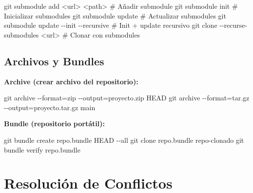 \documentclass[
  doc,
  floatsintext,
  longtable,
  a4paper,
  nolmodern,
  notxfonts,
  notimes,
  12pt,
  colorlinks=true,linkcolor=blue,citecolor=blue,urlcolor=blue]{apa7}
\newenvironment{Shaded}{\begin{snugshade}}{\end{snugshade}}
\newcommand{\AttributeTok}[1]{\textcolor[rgb]{0.40,0.45,0.13}{#1}}
\newcommand{\CommentTok}[1]{\textcolor[rgb]{0.37,0.37,0.37}{#1}}
\newcommand{\FunctionTok}[1]{\textcolor[rgb]{0.28,0.35,0.67}{#1}}
\newcommand{\NormalTok}[1]{\textcolor[rgb]{0.00,0.23,0.31}{#1}}
\newcommand{\OperatorTok}[1]{\textcolor[rgb]{0.37,0.37,0.37}{#1}}
\begin{document}
\begin{Shaded}
\begin{Highlighting}[]
\FunctionTok{git}\NormalTok{ submodule add }\OperatorTok{\textless{}}\NormalTok{url}\OperatorTok{\textgreater{}} \OperatorTok{\textless{}}\NormalTok{path}\OperatorTok{\textgreater{}}           \CommentTok{\# Añadir submodule}
\FunctionTok{git}\NormalTok{ submodule init                       }\CommentTok{\# Inicializar submodules}
\FunctionTok{git}\NormalTok{ submodule update                     }\CommentTok{\# Actualizar submodules}
\FunctionTok{git}\NormalTok{ submodule update }\AttributeTok{{-}{-}init} \AttributeTok{{-}{-}recursive}  \CommentTok{\# Init + update recursivo}
\FunctionTok{git}\NormalTok{ clone }\AttributeTok{{-}{-}recurse{-}submodules} \OperatorTok{\textless{}}\NormalTok{url}\OperatorTok{\textgreater{}}     \CommentTok{\# Clonar con submodules}
\end{Highlighting}
\end{Shaded}

\subsection{Archivos y Bundles}\label{archivos-y-bundles}

\textbf{Archive (crear archivo del repositorio):}

\begin{Shaded}
\begin{Highlighting}[]
\FunctionTok{git}\NormalTok{ archive }\AttributeTok{{-}{-}format}\OperatorTok{=}\NormalTok{zip }\AttributeTok{{-}{-}output}\OperatorTok{=}\NormalTok{proyecto.zip HEAD}
\FunctionTok{git}\NormalTok{ archive }\AttributeTok{{-}{-}format}\OperatorTok{=}\NormalTok{tar.gz }\AttributeTok{{-}{-}output}\OperatorTok{=}\NormalTok{proyecto.tar.gz main}
\end{Highlighting}
\end{Shaded}

\textbf{Bundle (repositorio portátil):}

\begin{Shaded}
\begin{Highlighting}[]
\FunctionTok{git}\NormalTok{ bundle create repo.bundle HEAD }\AttributeTok{{-}{-}all}
\FunctionTok{git}\NormalTok{ clone repo.bundle repo{-}clonado}
\FunctionTok{git}\NormalTok{ bundle verify repo.bundle}
\end{Highlighting}
\end{Shaded}

\section{Resolución de Conflictos}\label{resoluciuxf3n-de-conflictos}
\end{document}
